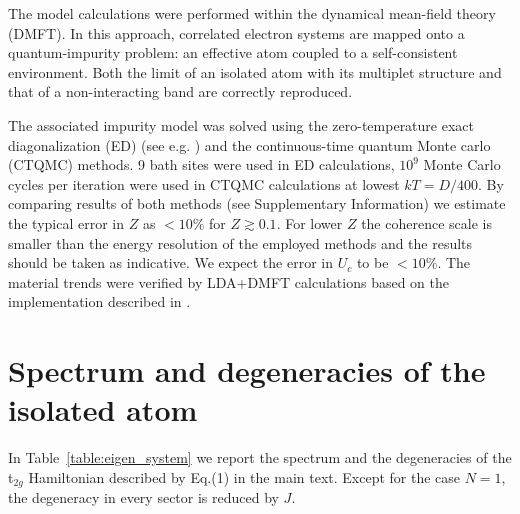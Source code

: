 \documentclass[aps,prl,amsmath, amssymb, english, aps, prl, onecolumn,
  reprint,floatfix, superscriptaddress]{revtex4-1}
\def\t2g{t${}_{2g}$}
\begin{document}
The model calculations were performed within the
dynamical mean-field theory (DMFT)\cite{georges96}.  In this approach, correlated electron systems are
mapped onto a quantum-impurity problem: an effective atom coupled to a
self-consistent environment. Both the limit of an isolated atom with
its multiplet structure and that of a non-interacting band are
correctly reproduced.

  The associated impurity model was
solved using the zero-temperature exact diagonalization (ED) 
(see e.g. \cite{georges96})
and the continuous-time quantum Monte carlo (CTQMC)
\cite{werner06} methods. 9 bath sites were used in ED calculations,
$10^9$ Monte Carlo cycles per iteration were used in CTQMC calculations at lowest
$kT=D/400$. By comparing results of both methods (see Supplementary Information)
we estimate the typical error in $Z$ as $<10\%$ for $Z\gtrsim0.1$. For
lower $Z$ the coherence scale is smaller than the energy resolution of
the employed methods and the results should be taken as
indicative. We expect the error in $U_c$ to be $<10\%$. The material trends were
verified by LDA+DMFT calculations based on the implementation described in \cite{aichhorn09}. 

\section{Spectrum and degeneracies of the isolated atom}

In Table~\ref{table:eigen_system} we report the spectrum and the
degeneracies of the \t2g  Hamiltonian described by Eq.(1) in the main text.
 Except for the case $N=1$, the degeneracy in every sector is reduced by $J$.

\end{document}
